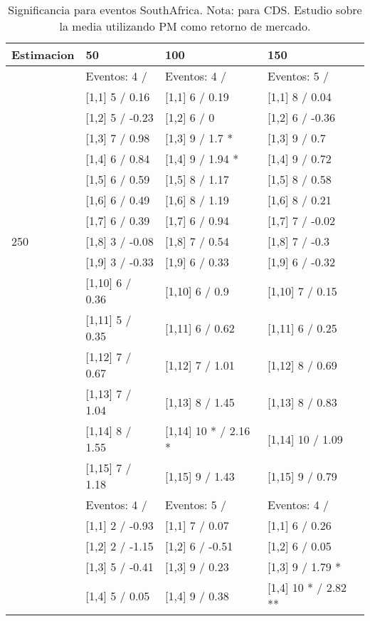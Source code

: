 \begin{table}

\caption{Significancia para eventos SouthAfrica. Nota: para CDS. Estudio sobre la media utilizando PM como retorno de mercado.}
\centering
\begin{tabular}[t]{llll}
\toprule
Estimacion & 50 & 100 & 150\\
\midrule
 & Eventos:  4 / & Eventos:  4 / & Eventos:  5 /\\
 & {}[1,1] 5  / 0.16 & {}[1,1] 6  / 0.19 & {}[1,1] 8  / 0.04\\
 & {}[1,2] 5  / -0.23 & {}[1,2] 6  / 0 & {}[1,2] 6  / -0.36\\
 & {}[1,3] 7  / 0.98 & {}[1,3] 9  / 1.7 * & {}[1,3] 9  / 0.7\\
 & {}[1,4] 6  / 0.84 & {}[1,4] 9  / 1.94 * & {}[1,4] 9  / 0.72\\
\addlinespace
 & {}[1,5] 6  / 0.59 & {}[1,5] 8  / 1.17 & {}[1,5] 8  / 0.58\\
 & {}[1,6] 6  / 0.49 & {}[1,6] 8  / 1.19 & {}[1,6] 8  / 0.21\\
 & {}[1,7] 6  / 0.39 & {}[1,7] 6  / 0.94 & {}[1,7] 7  / -0.02\\
250 & {}[1,8] 3  / -0.08 & {}[1,8] 7  / 0.54 & {}[1,8] 7  / -0.3\\
 & {}[1,9] 3  / -0.33 & {}[1,9] 6  / 0.33 & {}[1,9] 6  / -0.32\\
\addlinespace
 & {}[1,10] 6  / 0.36 & {}[1,10] 6  / 0.9 & {}[1,10] 7  / 0.15\\
 & {}[1,11] 5  / 0.35 & {}[1,11] 6  / 0.62 & {}[1,11] 6  / 0.25\\
 & {}[1,12] 7  / 0.67 & {}[1,12] 7  / 1.01 & {}[1,12] 8  / 0.69\\
 & {}[1,13] 7  / 1.04 & {}[1,13] 8  / 1.45 & {}[1,13] 8  / 0.83\\
 & {}[1,14] 8  / 1.55 & {}[1,14] 10 * / 2.16 * & {}[1,14] 10  / 1.09\\
\addlinespace
 & {}[1,15] 7  / 1.18 & {}[1,15] 9  / 1.43 & {}[1,15] 9  / 0.79\\
 & Eventos:  4 / & Eventos:  5 / & Eventos:  4 /\\
 & {}[1,1] 2  / -0.93 & {}[1,1] 7  / 0.07 & {}[1,1] 6  / 0.26\\
 & {}[1,2] 2  / -1.15 & {}[1,2] 6  / -0.51 & {}[1,2] 6  / 0.05\\
 & {}[1,3] 5  / -0.41 & {}[1,3] 9  / 0.23 & {}[1,3] 9  / 1.79 *\\
\addlinespace
 & {}[1,4] 5  / 0.05 & {}[1,4] 9  / 0.38 & {}[1,4] 10 * / 2.82 **\\

\end{tabular}
\end{table}
